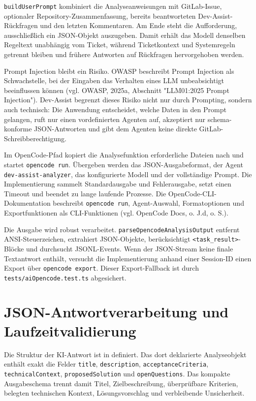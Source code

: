 \documentclass[12pt,a4paper,oneside]{scrreprt}
\begin{document}
\texttt{buildUserPrompt} kombiniert die Analyseanweisungen mit GitLab-Issue, optionaler Repository-Zusammenfassung, bereits beantworteten Dev-Assist-Rückfragen und den letzten Kommentaren. Am Ende steht die Aufforderung, ausschließlich ein JSON-Objekt auszugeben. Damit erhält das Modell denselben Regeltext unabhängig vom Ticket, während Ticketkontext und Systemregeln getrennt bleiben und frühere Antworten auf Rückfragen hervorgehoben werden.

Prompt Injection bleibt ein Risiko. OWASP beschreibt Prompt Injection als Schwachstelle, bei der Eingaben das Verhalten eines LLM unbeabsichtigt beeinflussen können (vgl. OWASP, 2025a, Abschnitt "LLM01:2025 Prompt Injection"). Dev-Assist begrenzt dieses Risiko nicht nur durch Prompting, sondern auch technisch: Die Anwendung entscheidet, welche Daten in den Prompt gelangen, ruft nur einen vordefinierten Agenten auf, akzeptiert nur schema-konforme JSON-Antworten und gibt dem Agenten keine direkte GitLab-Schreibberechtigung.

Im OpenCode-Pfad kopiert die Analysefunktion erforderliche Dateien nach  und startet \texttt{opencode run}. Übergeben werden das JSON-Ausgabeformat, der Agent \texttt{dev-assist-analyzer}, das konfigurierte Modell und der vollständige Prompt. Die Implementierung sammelt Standardausgabe und Fehlerausgabe, setzt einen Timeout und beendet zu lange laufende Prozesse. Die OpenCode-CLI-Dokumentation beschreibt \texttt{opencode run}, Agent-Auswahl, Formatoptionen und Exportfunktionen als CLI-Funktionen (vgl. OpenCode Docs, o. J.d, o. S.).

Die Ausgabe wird robust verarbeitet. \texttt{parseOpencodeAnalysisOutput} entfernt ANSI-Steuerzeichen, extrahiert JSON-Objekte, berücksichtigt \texttt{\textless{}task\_result\textgreater{}}-Blöcke und durchsucht JSONL-Events. Wenn der JSON-Stream keine finale Textantwort enthält, versucht die Implementierung anhand einer Session-ID einen Export über \texttt{opencode export}. Dieser Export-Fallback ist durch \texttt{tests/aiOpencode.test.ts} abgesichert.

\section{JSON-Antwortverarbeitung und Laufzeitvalidierung}

Die Struktur der KI-Antwort ist in  definiert. Das dort deklarierte Analyseobjekt enthält exakt die Felder \texttt{title}, \texttt{description}, \texttt{acceptanceCriteria}, \texttt{technicalContext}, \texttt{proposedSolution} und \texttt{openQuestions}. Das kompakte Ausgabeschema trennt damit Titel, Zielbeschreibung, überprüfbare Kriterien, belegten technischen Kontext, Lösungsvorschlag und verbleibende Unsicherheit.
\end{document}
